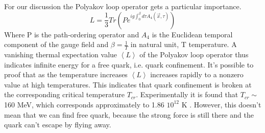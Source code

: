 \documentclass[12pt,a4paper]{book}
\begin{document}
	For our discussion the Polyakov loop operator gets a particular importance. 
	\begin{equation}
		L=\frac{1}{3} Tr \left(P e^{ig \int_{0}^{\beta} d\tau A_4(\vec{x},\tau) } \right)
		\label{eq:Polyakov-loop}
	\end{equation}
	Where P is the path-ordering operator and $A_4$ is the Euclidean temporal component of the gauge field and $\beta= \frac{1}{T}$ in natural unit, T temperature. A vanishing thermal expectation value $\left<L\right>$ of the Polyakov loop operator thus indicates infinite energy for a free quark, i.e. quark confinement. It's possible to proof that as the temperature increases $\left<L\right>$ increases rapidly to a nonzero value at high temperatures. This indicates that quark confinement is broken at the corresponding critical temperature $T_{cr}$. Experimentally it is found that $T_{cr} \sim$ 160 MeV, which corresponds approximately to 1.86 $10^{12}$ K \cite{Herrmann:2920632}. However, this doesn't mean that we can find free quark, because the strong force is still there and the quark can't escape by flying away.
	
\end{document}
